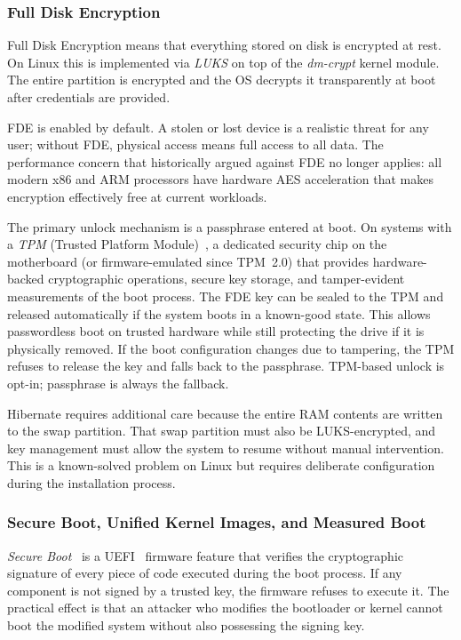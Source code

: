 \subsubsection{Full Disk Encryption}
\label{sec:fde}

Full Disk Encryption means that everything stored on disk is encrypted at
rest. On Linux this is implemented via \emph{LUKS} on top of the
\emph{dm-crypt} kernel module. The entire partition is encrypted and the OS
decrypts it transparently at boot after credentials are provided.

FDE is enabled by default. A stolen or lost device is a realistic threat for
any user; without FDE, physical access means full access to all data. The
performance concern that historically argued against FDE no longer applies:
all modern x86 and ARM processors have hardware AES acceleration that makes
encryption effectively free at current workloads.

The primary unlock mechanism is a passphrase entered at boot. On systems with
a \emph{TPM} (Trusted Platform Module)~\cite{archwiki:tpm}, a dedicated
security chip on the motherboard (or firmware-emulated since TPM~2.0) that
provides hardware-backed cryptographic operations, secure key storage, and
tamper-evident measurements of the boot process. The FDE key can be sealed to the TPM and released automatically
if the system boots in a known-good state. This allows passwordless boot on
trusted hardware while still protecting the drive if it is physically removed.
If the boot configuration changes due to tampering, the TPM refuses to release
the key and falls back to the passphrase. TPM-based unlock is opt-in;
passphrase is always the fallback.

Hibernate requires additional care because the entire RAM contents are written
to the swap partition. That swap partition must also be LUKS-encrypted, and
key management must allow the system to resume without manual intervention.
This is a known-solved problem on Linux but requires deliberate configuration
during the installation process.

\subsubsection{Secure Boot, Unified Kernel Images, and Measured Boot}
\label{sec:secureboot}

\emph{Secure Boot}~\cite{archwiki:secureboot} is a UEFI~\cite{uefi} firmware feature that verifies the cryptographic
signature of every piece of code executed during the boot process. If any
component is not signed by a trusted key, the firmware refuses to execute it.
The practical effect is that an attacker who modifies the bootloader or kernel
cannot boot the modified system without also possessing the signing key.

